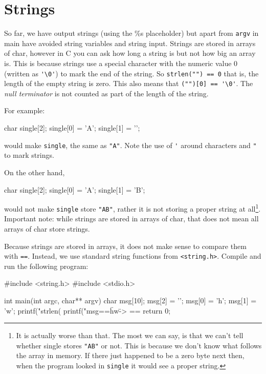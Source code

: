 
\chapter{Strings}



So far, we have output strings (using the \%s placeholder) but apart from \texttt{argv} in main have avoided string variables and string input.
Strings are stored in arrays of char, however in C you can ask how long a string is but not how big an array is.
This is because strings use a special character with the numeric value $0$ (written as \verb!'\0'!) to mark the end of the string.
So \lstinline!strlen("") == 0! that is, the length of the empty string is zero.
This also means that \lstinline!("")[0] == '\0'!.
The \emph{null terminator} is not counted as part of the length of the string.


For example:

\begin{codeblock}
char single[2];
single[0] = 'A';
single[1] = '\0';
\end{codeblock}

would make \texttt{single}, the same as \verb!"A"!.
Note the use of \verb!'! around characters and \verb!"! to mark strings.

On the other hand,
\begin{codeblock}
char single[2];
single[0] = 'A';
single[1] = 'B';
\end{codeblock}
would not make \texttt{single} store \verb!"AB"!, rather it is not storing a proper string at all\footnote{It is actually worse than that.
The most we can say, is that we can't tell whether single stores \texttt{"AB"} or not.
This is because we don't know what follows the array in memory.
If there just happened to be a zero byte next then, when the program looked in \texttt{single} it would see a proper string.
}.
Important note: while strings are stored in arrays of char, that does not mean all arrays of char store strings.

Because strings are stored in arrays, it does not make sense to compare them with \texttt{==}.
Instead, we use standard string functions from \lstinline{<string.h>}.
Compile and run the following program:
\begin{codeblock}
#include <string.h>
#include <stdio.h>

int main(int argc, char** argv) {
    char msg[10];	
    msg[2] = '\0';
    msg[0] = 'h';
    msg[1] = 'w';
    printf("strlen(%
    printf("msg==\"hw\" -> %
        ==%
    return 0;
}
\end{codeblock}

